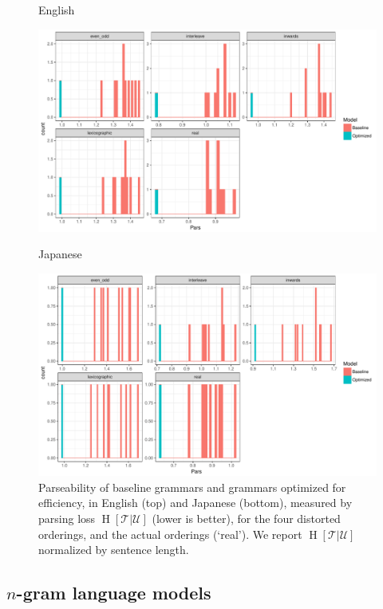 \documentclass[10pt,twoside,lineno]{article}
\newcommand{\utterance}{\mathcal{U}}
\newcommand{\tree}{\mathcal{T}}
\begin{document}
\begin{figure}
    \centering
    English
    
    \includegraphics[scale=.5]{../results/permuted/adversarial-parse-loss-english.pdf}
    
    Japanese
    
    \includegraphics[scale=.5]{../results/permuted/adversarial-parse-loss-japanese.pdf}
	\caption{Parseability of baseline grammars and grammars optimized for efficiency, in English (top) and Japanese (bottom), measured by parsing loss $\operatorname{H}[\tree|\utterance]$ (lower is better), for the four distorted orderings, and the actual orderings (`real'). We report $\operatorname{H}[\tree|\utterance]$ normalized by sentence length.}
    \label{fig:distorted-parser}
\end{figure}


\subsection{$n$-gram language models}
\end{document}
